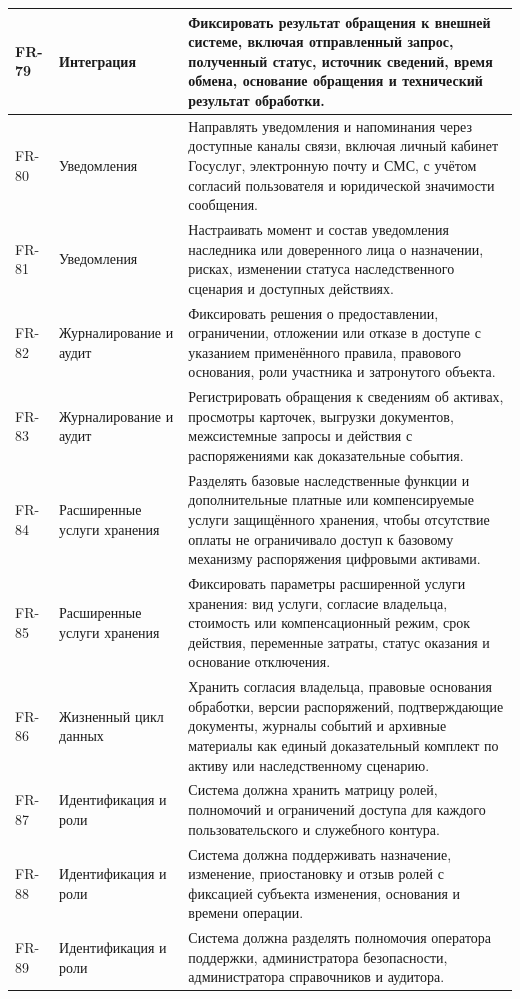 \begin{longtable}{|P{1.45cm}|P{3.35cm}|P{10.7cm}|}
FR-79 & Интеграция & Фиксировать результат обращения к внешней системе, включая отправленный запрос, полученный статус, источник сведений, время обмена, основание обращения и технический результат обработки.\\ \hline
FR-80 & Уведомления & Направлять уведомления и напоминания через доступные каналы связи, включая личный кабинет Госуслуг, электронную почту и СМС, с учётом согласий пользователя и юридической значимости сообщения.\\ \hline
FR-81 & Уведомления & Настраивать момент и состав уведомления наследника или доверенного лица о назначении, рисках, изменении статуса наследственного сценария и доступных действиях.\\ \hline
FR-82 & Журналирование и аудит & Фиксировать решения о предоставлении, ограничении, отложении или отказе в доступе с указанием применённого правила, правового основания, роли участника и затронутого объекта.\\ \hline
FR-83 & Журналирование и аудит & Регистрировать обращения к сведениям об активах, просмотры карточек, выгрузки документов, межсистемные запросы и действия с распоряжениями как доказательные события.\\ \hline
FR-84 & Расширенные услуги хранения & Разделять базовые наследственные функции и дополнительные платные или компенсируемые услуги защищённого хранения, чтобы отсутствие оплаты не ограничивало доступ к базовому механизму распоряжения цифровыми активами.\\ \hline
FR-85 & Расширенные услуги хранения & Фиксировать параметры расширенной услуги хранения: вид услуги, согласие владельца, стоимость или компенсационный режим, срок действия, переменные затраты, статус оказания и основание отключения.\\ \hline
FR-86 & Жизненный цикл данных & Хранить согласия владельца, правовые основания обработки, версии распоряжений, подтверждающие документы, журналы событий и архивные материалы как единый доказательный комплект по активу или наследственному сценарию.\\ \hline
FR-87 & Идентификация и роли & Система должна хранить матрицу ролей, полномочий и ограничений доступа для каждого пользовательского и служебного контура.\\ \hline
FR-88 & Идентификация и роли & Система должна поддерживать назначение, изменение, приостановку и отзыв ролей с фиксацией субъекта изменения, основания и времени операции.\\ \hline
FR-89 & Идентификация и роли & Система должна разделять полномочия оператора поддержки, администратора безопасности, администратора справочников и аудитора.\\ \hline

\end{longtable}
